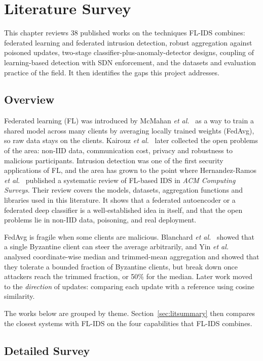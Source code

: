 \chapter{Literature Survey}
This chapter reviews 38 published works on the techniques FL-IDS combines: federated learning and federated intrusion detection, robust aggregation against poisoned updates, two-stage classifier-plus-anomaly-detector designs, coupling of learning-based detection with SDN enforcement, and the datasets and evaluation practice of the field. It then identifies the gaps this project addresses.

\section{Overview}
Federated learning (FL) was introduced by McMahan \emph{et al.}~\cite{mcmahan2017fedavg} as a way to train a shared model across many clients by averaging locally trained weights (FedAvg), so raw data stays on the clients. Kairouz \emph{et al.}~\cite{kairouz2021} later collected the open problems of the area: non-IID data, communication cost, privacy and robustness to malicious participants. Intrusion detection was one of the first security applications of FL, and the area has grown to the point where Hernandez-Ramos \emph{et al.}~\cite{hernandez2025fliids} published a systematic review of FL-based IDS in \emph{ACM Computing Surveys}. Their review covers the models, datasets, aggregation functions and libraries used in this literature. It shows that a federated autoencoder or a federated deep classifier is a well-established idea in itself, and that the open problems lie in non-IID data, poisoning, and real deployment.

FedAvg is fragile when some clients are malicious. Blanchard \emph{et al.}~\cite{blanchard2017} showed that a single Byzantine client can steer the average arbitrarily, and Yin \emph{et al.}~\cite{yin2018trimmed} analysed coordinate-wise median and trimmed-mean aggregation and showed that they tolerate a bounded fraction of Byzantine clients, but break down once attackers reach the trimmed fraction, or 50\% for the median. Later work moved to the \emph{direction} of updates: comparing each update with a reference using cosine similarity.

The works below are grouped by theme. Section~\ref{sec:litsummary} then compares the closest systems with FL-IDS on the four capabilities that FL-IDS combines.

\section{Detailed Survey}

